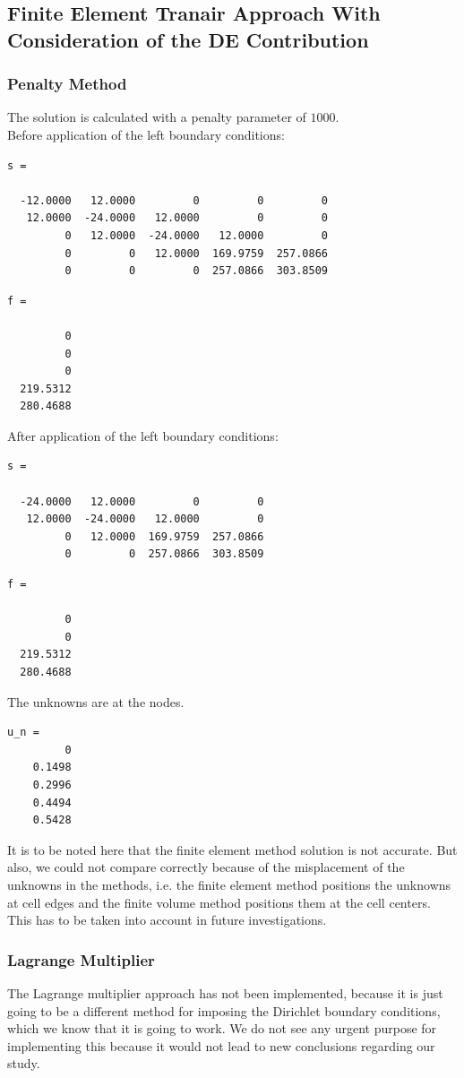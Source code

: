 \documentclass[a4paper,12pt]{article}
\begin{document}
\subsection{Finite Element Tranair Approach With Consideration of the DE Contribution}
\subsubsection{Penalty Method}
The solution is calculated with a penalty parameter of $1000$.\\
Before application of the left boundary conditions:
\begin{verbatim}
s =

  -12.0000   12.0000         0         0         0
   12.0000  -24.0000   12.0000         0         0
         0   12.0000  -24.0000   12.0000         0
         0         0   12.0000  169.9759  257.0866
         0         0         0  257.0866  303.8509
\end{verbatim}
\begin{verbatim}
f =

         0
         0
         0
  219.5312
  280.4688
\end{verbatim}
After application of the left boundary conditions:
\begin{verbatim}
s =

  -24.0000   12.0000         0         0
   12.0000  -24.0000   12.0000         0
         0   12.0000  169.9759  257.0866
         0         0  257.0866  303.8509
\end{verbatim}
\begin{verbatim}
f =

         0
         0
  219.5312
  280.4688
\end{verbatim}
The unknowns are at the nodes.
\begin{verbatim}
u_n =
         0
    0.1498
    0.2996
    0.4494
    0.5428
\end{verbatim}
It is to be noted here that the finite element method solution is not accurate. But also, we could not compare correctly because of the misplacement of the unknowns in the methods, i.e. the finite element method positions the unknowns at cell edges and the finite volume method positions them at the cell centers. This has to be taken into account in future investigations.
\subsubsection{Lagrange Multiplier}
The Lagrange multiplier approach has not been implemented, because it is just going to be a different method for imposing the Dirichlet boundary conditions, which we know that it is going to work. We do not see any urgent purpose for implementing this because it would not lead to new conclusions regarding our study. 
\end{document}
